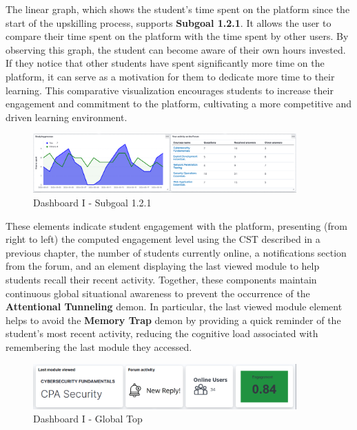 The linear graph, which shows the student's time spent on the platform since the start of the upskilling process, supports \textbf{Subgoal 1.2.1}. 
It allows the user to compare their time spent on the platform with the time spent by other users. 
By observing this graph, the student can become aware of their own hours invested. 
If they notice that other students have spent significantly more time on the platform, it can serve as a motivation for them to dedicate more time to their learning. 
This comparative visualization encourages students to increase their engagement and commitment to the platform, cultivating a more competitive and driven learning environment.


\begin{figure}[H]
    \centering
    \includegraphics[width=0.9\textwidth]{assets/dashboard_1_121.png}
    \caption{Dashboard I - Subgoal 1.2.1}
    \label{fig:dashboard_1_subgoal_121}
\end{figure}

These elements indicate student engagement with the platform, presenting (from right to left) the computed engagement level using the CST described in a previous chapter, the number of students currently online, a notifications section from the forum, and an element displaying the last viewed module to help students recall their recent activity. Together, these components maintain continuous global situational awareness to prevent the occurrence of the \textbf{Attentional Tunneling} demon.
In particular, the last viewed module element helps to avoid the \textbf{Memory Trap} demon by providing a quick reminder of the student's most recent activity, reducing the cognitive load associated with remembering the last module they accessed.

\begin{figure}[H]
    \centering
    \includegraphics[width=0.9\textwidth]{assets/dashboard_1_globaltop.png}
    \caption{Dashboard I - Global Top}
    \label{fig:dashboard_1_global_top}
\end{figure}

